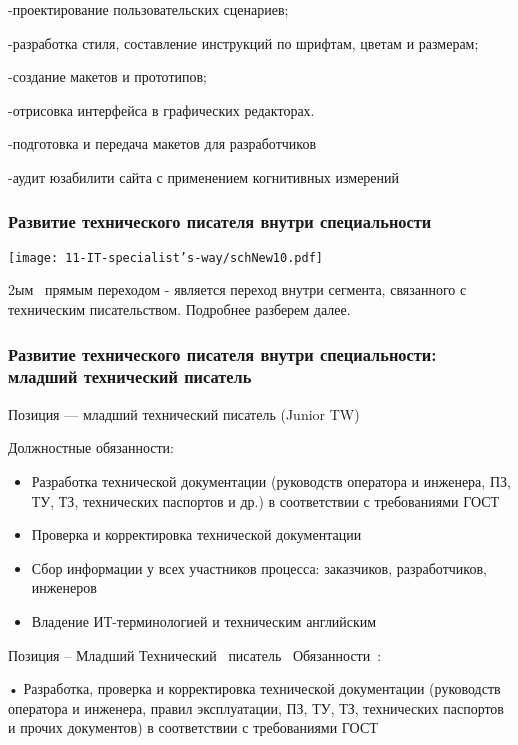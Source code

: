 \documentclass{../industrial-development}
\begin{document}
-проектирование пользовательских сценариев;

-разработка стиля, составление инструкций по шрифтам, цветам и размерам;

-создание макетов и прототипов;

-отрисовка интерфейса в графических редакторах.

-подготовка и передача макетов для разработчиков

-аудит юзабилити сайта с применением когнитивных измерений


\begin{frame} \frametitle{Развитие технического писателя внутри специальности }
  \centerline{\texttt{[image: 11-IT-specialist's-way/schNew10.pdf]}}
\end{frame}

\lecturenotes

 2ым~\cite{mc} прямым переходом  - является переход внутри сегмента, связанного с техническим писательством. Подробнее разберем далее.


\begin{frame} \frametitle{Развитие технического писателя внутри специальности: младший технический писатель }
  \begin{block}{}
  \alert{Позиция --- младший технический писатель (Junior TW) }

Должностные обязанности: 
  \end{block}
  \begin{itemize}
  \item  Разработка технической документации (руководств оператора и инженера, ПЗ, ТУ, ТЗ, технических паспортов и др.) в соответствии с требованиями  ГОСТ
  \item  Проверка и корректировка технической документации
  \item Сбор информации у всех участников процесса: заказчиков, разработчиков, инженеров
 \item Владение ИТ-терминологией и техническим английским
  \end{itemize}
\end{frame}


\lecturenotes

Позиция – Младший Технический~\cite{hh} писатель~\cite{itcf}
Обязанности~\cite{rab}:

•	Разработка, проверка и корректировка технической документации (руководств оператора и инженера, правил эксплуатации, ПЗ, ТУ, ТЗ, технических паспортов и прочих документов) в соответствии с требованиями ГОСТ 
\end{document}

